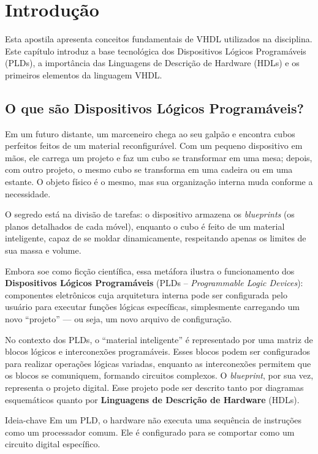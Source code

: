 \chapter{Introdução}

Esta apostila apresenta conceitos fundamentais de VHDL utilizados na disciplina. Este capítulo introduz a base tecnológica dos Dispositivos Lógicos Programáveis (PLDs), a importância das Linguagens de Descrição de Hardware (HDLs) e os primeiros elementos da linguagem VHDL.

\section{O que são Dispositivos Lógicos Programáveis?}

Em um futuro distante, um marceneiro chega ao seu galpão e encontra cubos perfeitos feitos de um material reconfigurável. Com um pequeno dispositivo em mãos, ele carrega um projeto e faz um cubo se transformar em uma mesa; depois, com outro projeto, o mesmo cubo se transforma em uma cadeira ou em uma estante. O objeto físico é o mesmo, mas sua organização interna muda conforme a necessidade.

O segredo está na divisão de tarefas: o dispositivo armazena os \textit{blueprints} (os planos detalhados de cada móvel), enquanto o cubo é feito de um material inteligente, capaz de se moldar dinamicamente, respeitando apenas os limites de sua massa e volume.

Embora soe como ficção científica, essa metáfora ilustra o funcionamento dos \textbf{Dispositivos Lógicos Programáveis} (PLDs – \textit{Programmable Logic Devices}): componentes eletrônicos cuja arquitetura interna pode ser configurada pelo usuário para executar funções lógicas específicas, simplesmente carregando um novo “projeto” — ou seja, um novo arquivo de configuração.

No contexto dos PLDs, o ``material inteligente'' é representado por uma matriz de blocos lógicos e interconexões programáveis. Esses blocos podem ser configurados para realizar operações lógicas variadas, enquanto as interconexões permitem que os blocos se comuniquem, formando circuitos complexos. O \textit{blueprint}, por sua vez, representa o projeto digital. Esse projeto pode ser descrito tanto por diagramas esquemáticos quanto por \textbf{Linguagens de Descrição de Hardware} (HDLs).

\begin{observacao}{Ideia-chave}
Em um PLD, o hardware não executa uma sequência de instruções como um processador comum. Ele é configurado para se comportar como um circuito digital específico.
\end{observacao}

